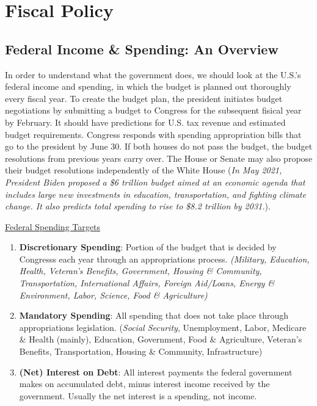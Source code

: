 \documentclass{article}
\begin{document}
\section{Fiscal Policy}

  \subsection{Federal Income \& Spending: An Overview}

    In order to understand what the government does, we should look at the U.S.'s federal income and spending, in which the budget is planned out thoroughly every fiscal year. To create the budget plan, the president initiates budget negotiations by submitting a budget to Congress for the subsequent fisical year by February. It should have predictions for U.S. tax revenue and estimated budget requirements. Congress responds with spending appropriation bills that go to the president by June 30. If both houses do not pass the budget, the budget resolutions from previous years carry over. The House or Senate may also propose their budget resolutions independently of the White House (\textit{In May 2021, President Biden proposed a \$6 trillion budget aimed at an economic agenda that includes large new investments in education, transportation, and fighting climate change. It also predicts total spending to rise to \$8.2 trillion by 2031.}).

    \underline{Federal Spending Targets}

    \begin{enumerate}
      \item \textbf{Discretionary Spending}: Portion of the budget that is decided by Congresss each year through an appropriations process. \textit{(Military, Education, Health, Veteran's Benefits, Government, Housing \& Community, Transportation, International Affairs, Foreign Aid/Loans, Energy \& Environment, Labor, Science, Food \& Agriculture)}
      \item \textbf{Mandatory Spending}: All spending that does not take place through appropriations legislation. (\textit{Social Security}, Unemployment, Labor, Medicare \& Health (mainly), Education, Government, Food \& Agriculture, Veteran's Benefits, Transportation, Housing \& Community, Infrastructure)
      \item \textbf{(Net) Interest on Debt}: All interest payments the federal government makes on accumulated debt, minus interest income received by the government. Usually the net interest is a spending, not income.
    \end{enumerate}
\end{document}
